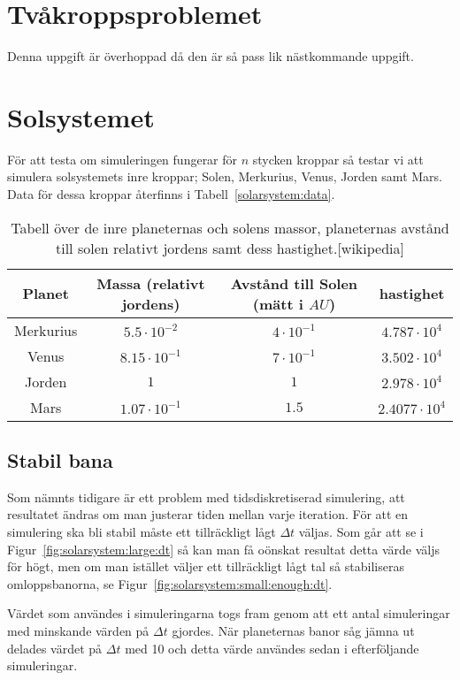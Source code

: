 \documentclass[a4]{article}
\begin{document}
\section{Tvåkroppsproblemet}
Denna uppgift är överhoppad då den är så pass lik nästkommande uppgift.

\section{Solsystemet}
För att testa om simuleringen fungerar för $n$ stycken kroppar så testar vi att
simulera solsystemets inre kroppar; Solen, Merkurius, Venus, Jorden samt Mars.
Data för dessa kroppar återfinns i Tabell~\vref{solarsystem:data}.

\begin{table}
\begin{center}
\begin{tabular}{c|c|c|c}
	Planet    & Massa (relativt jordens) & Avstånd till Solen (mätt i $AU$) & hastighet\\
	\hline
	Merkurius & $5.5 \cdot 10^{-2}$  & $4 \cdot 10^{-1}$  &  $4.787 \cdot 10^4$ \\
	Venus     & $8.15 \cdot 10^{-1}$ & $7 \cdot 10^{-1}$  &  $3.502 \cdot 10^4$ \\ 
	Jorden    & $1$                  & $1$                &  $2.978 \cdot 10^4$ \\
	Mars      & $1.07 \cdot 10^{-1}$ & $1.5$              &  $2.4077 \cdot 10^4$
\end{tabular}
\caption{
	Tabell över de inre planeternas och solens massor, planeternas avstånd till
	solen relativt jordens samt dess hastighet.[wikipedia]
}
\label{solarsystem:data}
\end{center}
\end{table}
	

		\subsection{Stabil bana}
Som nämnts tidigare är ett problem med tidsdiskretiserad simulering, att
resultatet ändras om man justerar tiden mellan varje iteration.
För att en simulering ska bli stabil måste ett tillräckligt lågt $\Delta t$
väljas.
Som går att se i Figur~\vref{fig:solarsystem:large:dt} så kan man få oönskat
resultat detta värde väljs för högt, men om man istället väljer ett
tillräckligt lågt tal så stabiliseras omloppsbanorna, se
Figur~\vref{fig:solarsystem:small:enough:dt}.

Värdet som användes i simuleringarna togs fram genom att ett antal simuleringar
med minskande värden på $\Delta t$ gjordes. 
När planeternas banor såg jämna ut delades värdet på $\Delta t$ med 10 och
detta värde användes sedan i efterföljande simuleringar.
\end{document}

